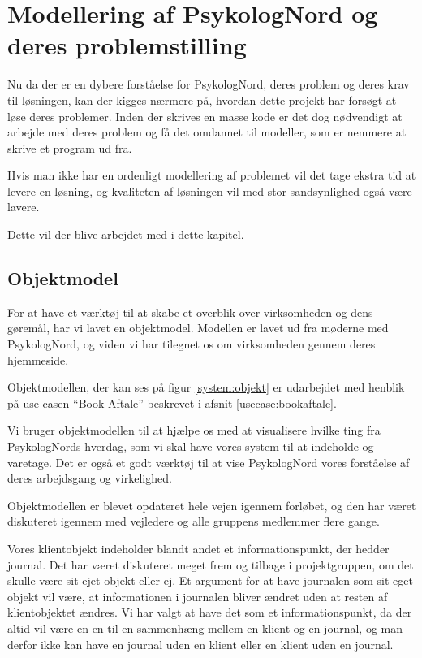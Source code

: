 \section{Modellering af PsykologNord og deres problemstilling}

Nu da der er en dybere forståelse for PsykologNord, deres problem og deres krav til løsningen, kan der kigges nærmere på, hvordan dette projekt har forsøgt at løse deres problemer.
Inden der skrives en masse kode er det dog nødvendigt at arbejde med deres problem og få det omdannet til modeller, som er nemmere at skrive et program ud fra.

Hvis man ikke har en ordenligt modellering af problemet vil det tage ekstra tid at levere en løsning, og kvaliteten af løsningen vil med stor sandsynlighed også være lavere.

Dette vil der blive arbejdet med i dette kapitel.

\subsection{Objektmodel}
\label{objektmodel}

For at have et værktøj til at skabe et overblik over virksomheden og dens gøremål, har vi lavet en objektmodel.
Modellen er lavet ud fra møderne med PsykologNord, og viden vi har tilegnet os om virksomheden gennem deres hjemmeside.\cite{psykolognord}

Objektmodellen, der kan ses på figur \ref{system:objekt} er udarbejdet med henblik på use casen ``Book Aftale'' beskrevet i afsnit \ref{usecase:bookaftale}.

Vi bruger objektmodellen til at hjælpe os med at visualisere hvilke ting fra PsykologNords hverdag, som vi skal have vores system til at indeholde og varetage.
Det er også et godt værktøj til at vise PsykologNord vores forståelse af deres arbejdsgang og virkelighed.

Objektmodellen er blevet opdateret hele vejen igennem forløbet, og den har været diskuteret igennem med vejledere og alle gruppens medlemmer flere gange.

Vores klientobjekt indeholder blandt andet et informationspunkt, der hedder journal.
Det har været diskuteret meget frem og tilbage i projektgruppen, om det skulle være sit ejet objekt eller ej.
Et argument for at have journalen som sit eget objekt vil være, at informationen i journalen bliver ændret uden at resten af klientobjektet ændres.
Vi har valgt at have det som et informationspunkt, da der altid vil være en en-til-en sammenhæng mellem en klient og en journal, og man derfor ikke kan have en journal uden en klient eller en klient uden en journal.

